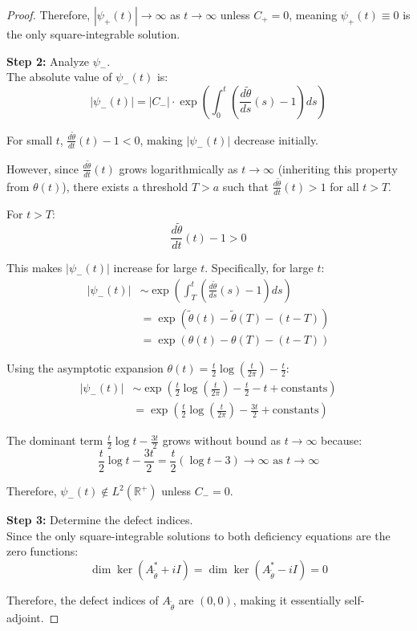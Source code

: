 \documentclass{article}
\theoremstyle{definition}
\begin{document}
\begin{proof}
Therefore, $|\psi_+(t)| \to \infty$ as $t \to \infty$ unless $C_+ = 0$, meaning $\psi_+(t) \equiv 0$ is the only square-integrable solution.

\textbf{Step 2:} Analyze $\psi_-$.\\
The absolute value of $\psi_-(t)$ is:
\begin{equation}
|\psi_-(t)| = |C_-| \cdot \exp\left(\int_0^t \left(\frac{d\tilde{\theta}}{ds}(s) - 1\right)ds\right)
\end{equation}

For small $t$, $\frac{d\tilde{\theta}}{dt}(t) - 1 < 0$, making $|\psi_-(t)|$ decrease initially. 

However, since $\frac{d\tilde{\theta}}{dt}(t)$ grows logarithmically as $t \to \infty$ (inheriting this property from $\theta(t)$), there exists a threshold $T > a$ such that $\frac{d\tilde{\theta}}{dt}(t) > 1$ for all $t > T$.

For $t > T$:
\begin{equation}
\frac{d\tilde{\theta}}{dt}(t) - 1 > 0
\end{equation}

This makes $|\psi_-(t)|$ increase for large $t$. Specifically, for large $t$:
\begin{align}
|\psi_-(t)| &\sim \exp\left(\int_T^t \left(\frac{d\tilde{\theta}}{ds}(s) - 1\right)ds\right) \\
&= \exp\left(\tilde{\theta}(t) - \tilde{\theta}(T) - (t-T)\right) \\
&= \exp\left(\theta(t) - \theta(T) - (t-T)\right)
\end{align}

Using the asymptotic expansion $\theta(t) = \frac{t}{2}\log\left(\frac{t}{2\pi}\right) - \frac{t}{2}$:
\begin{align}
|\psi_-(t)| &\sim \exp\left(\frac{t}{2}\log\left(\frac{t}{2\pi}\right) - \frac{t}{2} - t + \text{constants}\right) \\
&= \exp\left(\frac{t}{2}\log\left(\frac{t}{2\pi}\right) - \frac{3t}{2} + \text{constants}\right)
\end{align}

The dominant term $\frac{t}{2}\log t - \frac{3t}{2}$ grows without bound as $t \to \infty$ because:
\begin{equation}
\frac{t}{2}\log t - \frac{3t}{2} = \frac{t}{2}(\log t - 3) \to \infty \text{ as } t \to \infty
\end{equation}

Therefore, $\psi_-(t) \not\in L^2(\mathbb{R}^+)$ unless $C_- = 0$.

\textbf{Step 3:} Determine the defect indices.\\
Since the only square-integrable solutions to both deficiency equations are the zero functions:
\begin{equation}
\dim\ker(A_{\tilde{\theta}}^* + iI) = \dim\ker(A_{\tilde{\theta}}^* - iI) = 0
\end{equation}

Therefore, the defect indices of $A_{\tilde{\theta}}$ are $(0,0)$, making it essentially self-adjoint.
\end{proof}
\end{document}
